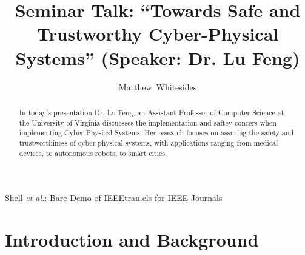 \documentclass[journal,onecolumn]{IEEEtran}
\begin{document}
%
\title{Seminar Talk: ``Towards Safe and Trustworthy Cyber-Physical Systems'' (Speaker: Dr. Lu Feng)}

%
%
%
\author{Matthew~Whitesides}%

%
{Shell \MakeLowercase{\textit{et al.}}: Bare Demo of IEEEtran.cls for IEEE Journals}

\maketitle

\begin{abstract}
In today's presentation Dr. Lu Feng, an Assistant Professor of Computer Science at the University of Virginia discuesses the implementation and saftey concers when implementing Cyber Physical Systems. Her research focuses on assuring the safety and trustworthiness of cyber-physical systems, with applications ranging from medical devices, to autonomous robots, to smart cities. 
\end{abstract}


\IEEEpeerreviewmaketitle

\section{Introduction and Background}
\end{document}
